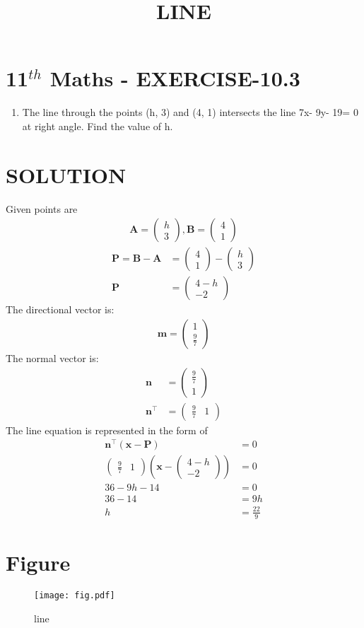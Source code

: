 \documentclass[12pt]{article}
\providecommand{\brak}[1]{\ensuremath{\left(#1\right)}}
\newcommand{\myvec}[1]{\ensuremath{\begin{pmatrix}#1\end{pmatrix}}}
\let\vec\mathbf
\begin{document}
\begin{center}
\title{\textbf{LINE}}
\date{\vspace{-5ex}} %
\maketitle
\end{center}

\section{11$^{th}$ Maths - EXERCISE-10.3}
\begin{enumerate}
\item The line through the points (h, 3) and (4, 1) intersects the line 7x- 9y- 19= 0 at right angle. Find the value of h.
\end{enumerate}
\section{SOLUTION}
Given points are 
\begin{align}
\vec{A}=\myvec{h\\ 3},\vec{B}=\myvec{4\\ 1}
\end{align}
\begin{align}
\vec{P}=\vec{B}-\vec{A}&=\myvec{4\\ 1}-\myvec{h\\ 3}\\
\vec{P}&=\myvec{4-h\\ -2}
\end{align}
The directional vector is:
\begin{align}
\vec{m}=\myvec{1\\ \frac{9}{7}}
\end{align}
The normal vector is:
\begin{align}
\vec{n}&=\myvec{\frac{9}{7}\\ 1}\\
	\vec{n}^\top&=\myvec{\frac{9}{7}& 1}	
\end{align}
The line equation is represented in the form of 
\begin{align}
\vec{n}^\top \brak{\vec{x}-\vec{P}}&= 0 \\
\myvec{\frac{9}{7}& 1}\brak{\vec{x}-\myvec{4-h\\ -2}}&=0\\
36-9h-14&=0\\
36-14&=9h\\
h&=\frac{22}{9}
\end{align}
\section{Figure}
\begin{figure}[h]
\centering
\texttt{[image: fig.pdf]}
\caption{line}
		\label{fig:Figure}
\end{figure}
\end{document}
